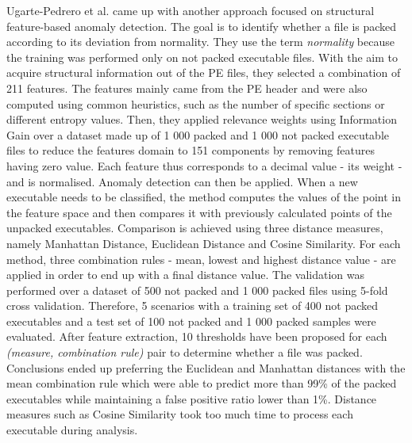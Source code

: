 Ugarte-Pedrero et al. \cite{ugarte-pedrero_structural_2011} came up with another approach focused on structural feature-based anomaly detection. The goal is to identify whether a file is packed according to its deviation from normality. They use the term \textit{normality} because the training was performed only on not packed executable files. With the aim to acquire structural information out of the PE files, they selected a combination of 211 features. The features mainly came from the PE header and were also computed using common heuristics, such as the number of specific sections or different entropy values. Then, they applied relevance weights using Information Gain over a dataset made up of 1 000 packed and 1 000 not packed executable files to reduce the features domain to 151 components by removing features having zero value. Each feature thus corresponds to a decimal value - its weight - and is normalised. Anomaly detection can then be applied. When a new executable needs to be classified, the method computes the values of the point in the feature space and then compares it with previously calculated points of the unpacked executables. Comparison is achieved using three distance measures, namely Manhattan Distance, Euclidean Distance and Cosine Similarity. For each method, three combination rules - mean, lowest and highest distance value - are applied in order to end up with a final distance value. The validation was performed over a dataset of 500 not packed and 1 000 packed files using 5-fold cross validation. Therefore, 5 scenarios with a training set of 400 not packed executables and a test set of 100 not packed and 1 000 packed samples were evaluated. After feature extraction, 10 thresholds have been proposed for each \textit{(measure, combination rule)} pair to determine whether a file was packed. Conclusions ended up preferring the Euclidean and Manhattan distances with the mean combination rule which were able to predict more than 99\% of the packed executables while maintaining a false positive ratio lower than 1\%. Distance measures such as Cosine Similarity took too much time to process each executable during analysis.

